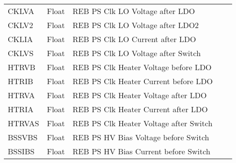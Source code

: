 \begin{longtable}{l l l l l}
CKLVA & Float & REB PS Clk LO Voltage after LDO         \\
CKLV2 & Float & REB PS Clk LO Voltage after LDO2        \\
CKLIA & Float & REB PS Clk LO Current after LDO         \\
CKLVS & Float & REB PS Clk LO Voltage after Switch      \\
HTRVB & Float & REB PS Clk Heater Voltage before LDO    \\
HTRIB & Float & REB PS Clk Heater Current before LDO    \\
HTRVA & Float & REB PS Clk Heater Voltage after LDO     \\
HTRIA & Float & REB PS Clk Heater Current after LDO    \\
HTRVAS & Float & REB PS Clk Heater Voltage after Switch \\
BSSVBS & Float & REB PS HV Bias Voltage before Switch    \\
BSSIBS & Float & REB PS HV Bias Current before Switch    \\
\hline
\end{longtable}

